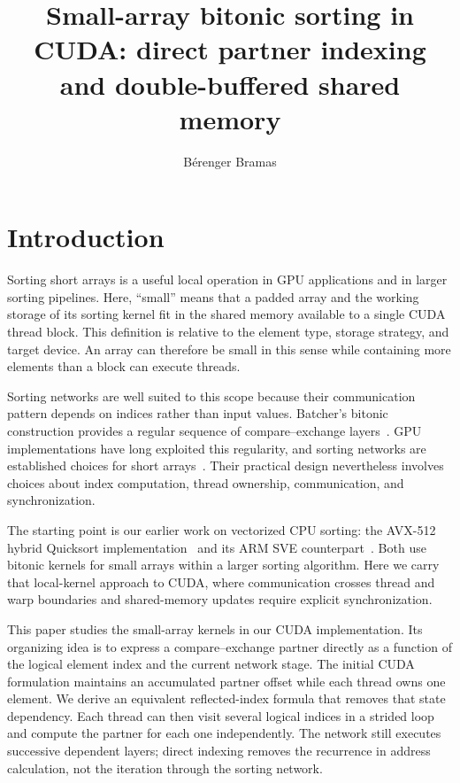 \documentclass[fleqn,10pt,lineno]{wlpeerj}
\title{Small-array bitonic sorting in CUDA: direct partner indexing and double-buffered shared memory}
\author{B\'erenger Bramas}
\begin{document}
\flushbottom
\maketitle
\thispagestyle{empty}

\section*{Introduction}
\label{sec:introduction}
Sorting short arrays is a useful local operation in GPU applications and in larger sorting pipelines. Here, ``small'' means that a padded array and the working storage of its sorting kernel fit in the shared memory available to a single CUDA thread block. This definition is relative to the element type, storage strategy, and target device. An array can therefore be small in this sense while containing more elements than a block can execute threads.

Sorting networks are well suited to this scope because their communication pattern depends on indices rather than input values. Batcher's bitonic construction provides a regular sequence of compare--exchange layers~\citep{batcher1968sorting}. GPU implementations have long exploited this regularity, and sorting networks are established choices for short arrays~\citep{kipfer2005improved,nvidiaSortingNetworks}. Their practical design nevertheless involves choices about index computation, thread ownership, communication, and synchronization.

The starting point is our earlier work on vectorized CPU sorting: the AVX-512 hybrid Quicksort implementation~\citep{bramas2017avx512} and its ARM SVE counterpart~\citep{bramas2021sve}. Both use bitonic kernels for small arrays within a larger sorting algorithm. Here we carry that local-kernel approach to CUDA, where communication crosses thread and warp boundaries and shared-memory updates require explicit synchronization.

This paper studies the small-array kernels in our CUDA implementation. Its organizing idea is to express a compare--exchange partner directly as a function of the logical element index and the current network stage. The initial CUDA formulation maintains an accumulated partner offset while each thread owns one element. We derive an equivalent reflected-index formula that removes that state dependency. Each thread can then visit several logical indices in a strided loop and compute the partner for each one independently. The network still executes successive dependent layers; direct indexing removes the recurrence in address calculation, not the iteration through the sorting network.
\end{document}
